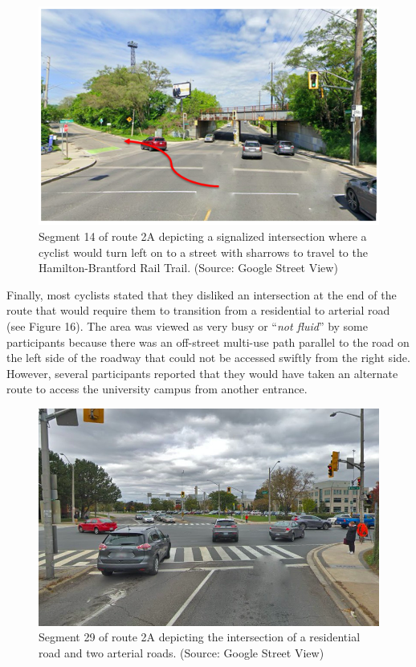 \documentclass[]{elsarticle} %
\begin{document}
\begin{figure}

{\centering \includegraphics[width=0.65\linewidth]{Figure 14a} 

}

\caption{Segment 14 of route 2A depicting a signalized intersection where a cyclist would turn left on to a street with sharrows to travel to the Hamilton-Brantford Rail Trail. (Source: Google Street View)}\label{fig:figure-15}
\end{figure}

Finally, most cyclists stated that they disliked an intersection at the
end of the route that would require them to transition from a
residential to arterial road (see Figure 16). The area was viewed as
very busy or ``\emph{not fluid}'' by some participants because there was
an off-street multi-use path parallel to the road on the left side of
the roadway that could not be accessed swiftly from the right side.
However, several participants reported that they would have taken an
alternate route to access the university campus from another entrance.

\begin{figure}

{\centering \includegraphics[width=0.65\linewidth]{Figure 15} 

}

\caption{Segment 29 of route 2A depicting the intersection of a residential road and two arterial roads. (Source: Google Street View)}\label{fig:figure-16}
\end{figure}
\end{document}
